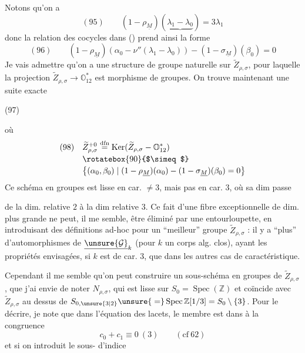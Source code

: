 Notons qu'on a
\[
(95)\qquad (1-\rho_{\underline M})
(\underbrace{\lambda_1-\lambda_0})=3\lambda_1
\]
donc la relation des cocycles dans ()
prend ainsi la forme
\[
(96)\qquad
(1-\rho_{\underline M})(\alpha_0-\nu''(\lambda_1-\lambda_0))
-(1-\sigma_{\underline M})(\beta_0)=0
\]
Je vais admettre  qu'on a une structure de groupe naturelle sur
$\widetilde Z_{\rho,\sigma}$, pour laquelle la projection
$\widetilde Z_{\rho,\sigma}\to\mathbb O_{12}^{*}$
est morphisme de groupes. On trouve maintenant une suite exacte

\begin{samepage}
(97)
\end{samepage}
où
\[
\begin{aligned}
(98)\quad&\widetilde Z_{\rho,\sigma}^{+0}
\overset{\mathrm{dfn}}=\operatorname{Ker}
(\widetilde Z_{\rho,\sigma}\mathbin{-}\mathbb O_{12}^{*})\\[-2pt]
&\rotatebox{90}{$\simeq$}\\[-2pt]
&\bigl\{(\alpha_0,\beta_0)\mid
(1-\rho_{\underline M})(\alpha_0)-(1-\sigma_{\underline M})(\beta_0)=0\bigr\}
\end{aligned}
\]
Ce schéma en groupes est lisse en car. $\ne3$, mais pas en car. $3$, où sa dim passe


de la dim. relative $2$ à la dim relative $3$.
Ce fait d'une fibre exceptionnelle de dim. plus grande ne peut, il me semble, être
éliminé par une entourloupette,  en introduisant
 des définitions ad-hoc pour un ``meilleur'' groupe
$\widetilde Z_{\rho,\sigma}$ : il y a ``plus'' d'automorphismes de
$\underline{\unsure{\mathcal G}}_k$ (pour $k$ un
corps alg. clos), ayant les propriétés envisagées, si $k$ est de car. $3$, que dans les autres cas de caractéristique.

Cependant il me semble qu'on peut construire un sous-schéma en groupes
 de $\widetilde Z_{\rho,\sigma}$, que j'ai envie de noter
$N_{\rho,\sigma}$, qui est lisse sur $S_0=\operatorname{Spec}(\mathbb Z)$ et
coïncide avec $\widetilde Z_{\rho,\sigma}$ au dessus de
$S_{0,\unsure{3|2}}\unsure{{}=}\operatorname{Spec}\mathbb Z[1/3]=S_0\setminus\{3\}$.
Pour le décrire, je note que dans l'équation des lacets,
le  membre est
 dans
à la congruence
\[
c_0+c_1\equiv0\ (3)\qquad(\mathrm{cf}\ 62)
\]
et si on introduit le sous- d'indice

